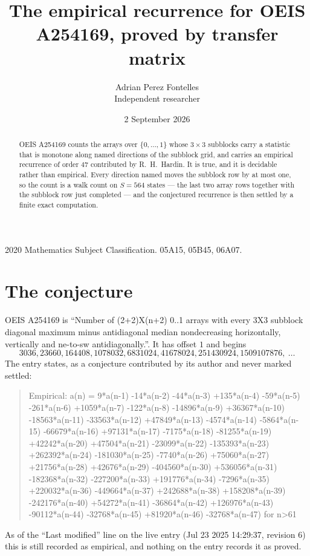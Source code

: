 \documentclass[11pt,a4paper]{article}
\title{The empirical recurrence for OEIS A254169, proved by transfer matrix}
\author{Adrian Perez Fontelles\\ \small Independent researcher}
\date{2 September 2026}
\theoremstyle{plain}
\theoremstyle{definition}
\begin{document}
\maketitle

\begin{abstract}
OEIS A254169 counts the arrays over $\{0,\dots,1\}$ whose $3\times3$ subblocks carry a
statistic that is monotone along named directions of the subblock grid, and carries an
empirical recurrence of order $47$ contributed by R.~H.~Hardin. It is true, and it is
decidable rather than empirical. Every direction named moves the subblock row by at most one,
so the count is a walk count on $S=564$ states --- the last two array rows together with the
subblock row just completed --- and the conjectured recurrence is then settled by a finite
exact computation.
\end{abstract}

\noindent\small 2020 Mathematics Subject Classification. 05A15, 05B45, 06A07.\normalsize

\section{The conjecture}

OEIS A254169 is ``Number of (2+2)X(n+2) 0..1 arrays with every 3X3 subblock diagonal maximum minus antidiagonal median nondecreasing horizontally, vertically and ne-to-sw antidiagonally.''. It has offset $1$ and begins
\[
3036, 23660, 164408, 1078032, 6831024, 41678024, 251430924, 1509107876,\ \dots
\]
The entry states, as a conjecture contributed by its author and never marked settled:
\begin{quote}
Empirical: a(n) = 9*a(n-1) -14*a(n-2) -44*a(n-3) +135*a(n-4) -59*a(n-5) -261*a(n-6) +1059*a(n-7) -122*a(n-8) -14896*a(n-9) +36367*a(n-10) -18563*a(n-11) -33563*a(n-12) +47849*a(n-13) -4574*a(n-14) -5864*a(n-15) -66679*a(n-16) +97131*a(n-17) -7175*a(n-18) -81255*a(n-19) +42242*a(n-20) +47504*a(n-21) -23099*a(n-22) -135393*a(n-23) +262392*a(n-24) -181030*a(n-25) -7740*a(n-26) +75060*a(n-27) +21756*a(n-28) +42676*a(n-29) -404560*a(n-30) +536056*a(n-31) -182368*a(n-32) -227200*a(n-33) +191776*a(n-34) -7296*a(n-35) +220032*a(n-36) -449664*a(n-37) +242688*a(n-38) +158208*a(n-39) -242176*a(n-40) +54272*a(n-41) -36864*a(n-42) +126976*a(n-43) -90112*a(n-44) -32768*a(n-45) +81920*a(n-46) -32768*a(n-47) for n>61
\end{quote}
As of the ``Last modified'' line on the live entry (Jul 23 2025 14:29:37, revision 6) this is still
recorded as empirical, and nothing on the entry records it as proved.
\end{document}

